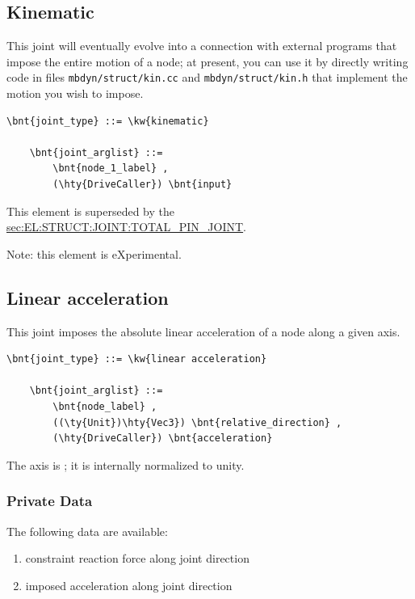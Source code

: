 


\subsection{Kinematic}
This joint will eventually evolve into a connection with external programs
that impose the entire motion of a node; at present, you can use it
by directly writing code in files \verb;mbdyn/struct/kin.cc; and
\verb;mbdyn/struct/kin.h; that implement the motion you wish to impose.
\begin{Verbatim}[commandchars=\\\{\}]
    \bnt{joint_type} ::= \kw{kinematic}

    \bnt{joint_arglist} ::= 
        \bnt{node_1_label} ,
        (\hty{DriveCaller}) \bnt{input}
\end{Verbatim}
This element is superseded by the
\hyperref{\kw{total pin joint}}{\kw{total pin joint}, see Section~}{}{sec:EL:STRUCT:JOINT:TOTAL_PIN_JOINT}.

Note: this element is eXperimental.

\subsection{Linear acceleration}
This joint imposes the absolute linear acceleration of a node
along a given axis.
\begin{Verbatim}[commandchars=\\\{\}]
    \bnt{joint_type} ::= \kw{linear acceleration}

    \bnt{joint_arglist} ::=
        \bnt{node_label} ,
        ((\ty{Unit})\hty{Vec3}) \bnt{relative_direction} , 
        (\hty{DriveCaller}) \bnt{acceleration}
\end{Verbatim}
The axis is ; it is internally normalized to unity.

\subsubsection{Private Data}
The following data are available:
\begin{enumerate}
\item {} constraint reaction force along joint direction
\item {} imposed acceleration along joint direction
\end{enumerate}

